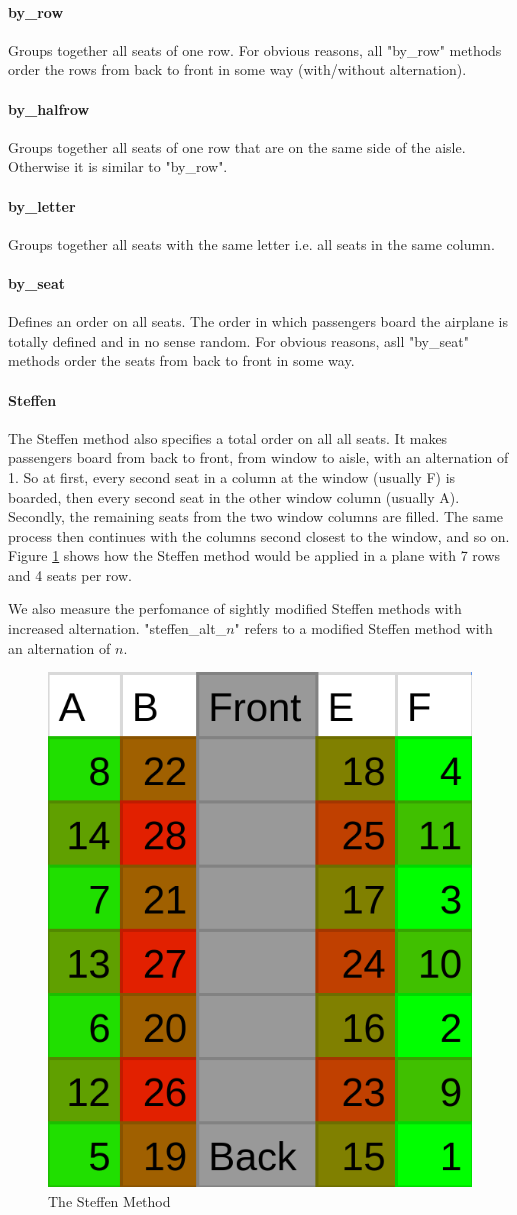 \documentclass[11pt]{article}
\begin{document}
\paragraph{by\_row} Groups together all seats of one row. For obvious reasons, all "by\_row" methods order the rows from back to front in some way (with/without alternation).

\paragraph{by\_halfrow} Groups together all seats of one row that are on the same side of the aisle. Otherwise it is similar to "by\_row".

\paragraph{by\_letter} Groups together all seats with the same letter i.e. all seats in the same column.

\paragraph{by\_seat} Defines an order on all seats. The order in which passengers board the airplane is totally defined and in no sense random. For obvious reasons, asll "by\_seat" methods order the seats from back to front in some way.

\paragraph{Steffen}
The Steffen method also specifies a total order on all all seats. It makes passengers board from back to front, from window to aisle, with an alternation of 1. So at first, every second seat in a column at the window (usually F) is boarded, then every second seat in the other window column (usually A). Secondly, the remaining seats from the two window columns are filled. The same process then continues with the columns second closest to the window, and so on. Figure \ref{fig:steffen} shows how the Steffen method would be applied in a plane with 7 rows and 4 seats per row.


We also measure the perfomance of sightly modified Steffen methods with increased alternation. "steffen\_alt\_$n$" refers to a modified Steffen method with an alternation of $n$.

\begin{figure}
	\center
	\label{fig:steffen}
	\includegraphics[width=0.3\linewidth]{images/steffen.png}
	\caption{The Steffen Method}
\end{figure}
\end{document}
